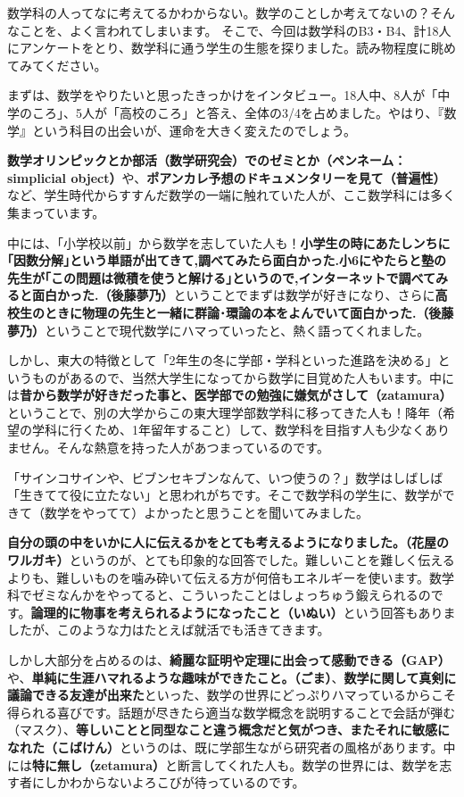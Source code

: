 数学科の人ってなに考えてるかわからない。数学のことしか考えてないの？そんなことを、よく言われてしまいます。
そこで、今回は数学科のB3・B4、計18人にアンケートをとり、数学科に通う学生の生態を探りました。読み物程度に眺めてみてください。

まずは、数学をやりたいと思ったきっかけをインタビュー。18人中、8人が「中学のころ」、5人が「高校のころ」と答え、全体の3/4を占めました。やはり、『数学』という科目の出会いが、運命を大きく変えたのでしょう。

\textbf{数学オリンピックとか部活（数学研究会）でのゼミとか（ペンネーム：simplicial object）}や、\textbf{ポアンカレ予想のドキュメンタリーを見て（普遍性）}など、学生時代からすすんだ数学の一端に触れていた人が、ここ数学科には多く集まっています。

中には、「小学校以前」から数学を志していた人も！\textbf{小学生の時にあたしンちに｢因数分解｣という単語が出てきて,調べてみたら面白かった.小6にやたらと塾の先生が｢この問題は微積を使うと解ける｣というので,インターネットで調べてみると面白かった.（後藤夢乃）}ということでまずは数学が好きになり、さらに\textbf{高校生のときに物理の先生と一緒に群論･環論の本をよんでいて面白かった.（後藤夢乃）}ということで現代数学にハマっていったと、熱く語ってくれました。

しかし、東大の特徴として「2年生の冬に学部・学科といった進路を決める」というものがあるので、当然大学生になってから数学に目覚めた人もいます。中には\textbf{昔から数学が好きだった事と、医学部での勉強に嫌気がさして（zatamura）}ということで、別の大学からこの東大理学部数学科に移ってきた人も！降年（希望の学科に行くため、1年留年すること）して、数学科を目指す人も少なくありません。そんな熱意を持った人があつまっているのです。

「サインコサインや、ビブンセキブンなんて、いつ使うの？」数学はしばしば「生きてて役に立たない」と思われがちです。そこで数学科の学生に、数学ができて（数学をやってて）よかったと思うことを聞いてみました。

\textbf{自分の頭の中をいかに人に伝えるかをとても考えるようになりました。（花屋のワルガキ）}というのが、とても印象的な回答でした。難しいことを難しく伝えるよりも、難しいものを噛み砕いて伝える方が何倍もエネルギーを使います。数学科でゼミなんかをやってると、こういったことはしょっちゅう鍛えられるのです。\textbf{論理的に物事を考えられるようになったこと（いぬい）}という回答もありましたが、このような力はたとえば就活でも活きてきます。

しかし大部分を占めるのは、\textbf{綺麗な証明や定理に出会って感動できる（GAP）}や、\textbf{単純に生涯ハマれるような趣味ができたこと。（ごま）}、\textbf{数学に関して真剣に議論できる友達が出来た}といった、数学の世界にどっぷりハマっているからこそ得られる喜びです。{話題が尽きたら適当な数学概念を説明することで会話が弾む（マスク）}、\textbf{等しいことと同型なこと違う概念だと気がつき、またそれに敏感になれた（こばけん）}というのは、既に学部生ながら研究者の風格があります。中には\textbf{特に無し（zetamura）}と断言してくれた人も。数学の世界には、数学を志す者にしかわからないよろこびが待っているのです。

